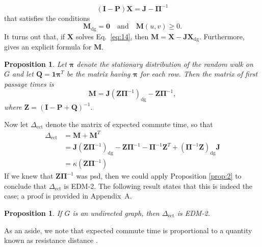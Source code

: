 \documentclass[10pt,twocolumn]{article}
\newtheorem{proposition}[theorem]{Proposition}
\numberwithin{equation}{section}
\begin{document}
\begin{equation}
  \label{eq:14}
  (\mathbf{I} - \mathbf{P})\mathbf{X} = \mathbf{J} - \bm{\Pi}^{-1}
\end{equation}
that satisfies the conditions 
\begin{equation}
  \label{eq:7}
  \mathbf{M}_{\mathrm{dg}} = \mathbf{0} \quad \mbox{and} \quad
\mathbf{M}(u,v) \geq 0.
\end{equation}
It turns out that, if $\mathbf{X}$ solves
Eq.~\eqref{eq:14}, then $\mathbf{M}
= \mathbf{X} - \mathbf{J}\mathbf{X}_{\mathrm{dg}}$. Furthermore, 
\cite{kemeny83:_finit_markov_chain} gives 
an explicit formula for $\mathbf{M}$. 
\begin{proposition}
  \label{prop:3}
  Let $\bm{\pi}$ denote the stationary distribution of the
random walk on $G$ and let
$\mathbf{Q} = \mathbf{1}\bm{\pi}^{T}$ be the matrix having
$\bm{\pi}$ for each row.
  Then the matrix of first passage times is 
  \begin{equation}
    \label{eq:8}
    \mathbf{M} = \mathbf{J}(\mathbf{Z} \bm{\Pi}^{-1})_{\mathrm{dg}} - 
\mathbf{Z} \bm{\Pi}^{-1},
  \end{equation}
  where $\mathbf{Z} = (\mathbf{I} - \mathbf{P} + \mathbf{Q})^{-1}$. 
\end{proposition}
\noindent
Now let $\Delta_{\mbox{ect}}$ denote the matrix of expected commute time,
so that
\begin{equation*}
  \begin{split}
    \Delta_{\mbox{ect}} &= \mathbf{M} + \mathbf{M}^{T} \\ &= 
    \mathbf{J}(\mathbf{Z}\bm{\Pi}^{-1})_{\mathrm{dg}} - 
\mathbf{Z}\bm{\Pi}^{-1} -
    \bm{\Pi}^{-1}\mathbf{Z}^{T} +
    (\bm{\Pi}^{-1}\mathbf{Z})_{\mathrm{dg}}\mathbf{J} \\
    &= \kappa(\mathbf{Z}\bm{\Pi}^{-1})
  \end{split}
\end{equation*}
\noindent
If we knew that $\mathbf{Z}\bm{\Pi}^{-1}$ was psd,
then we could apply Proposition \ref{prop:2} to conclude
that $\Delta_{\mbox{ect}}$ is EDM-2.  The following result
states that this is indeed the case; a proof is provided in
Appendix~A.
\begin{proposition}
  \label{prop:4}
  If $G$ is an undirected graph, then $\Delta_{\mbox{ect}}$ is EDM-2. 
\end{proposition}
\noindent
As an aside, we note that expected commute
time is proportional to a quantity known as resistance distance
\cite{bapat99:_resis_distan_in_graph,klein93:_resis_distan}. 
\end{document}
